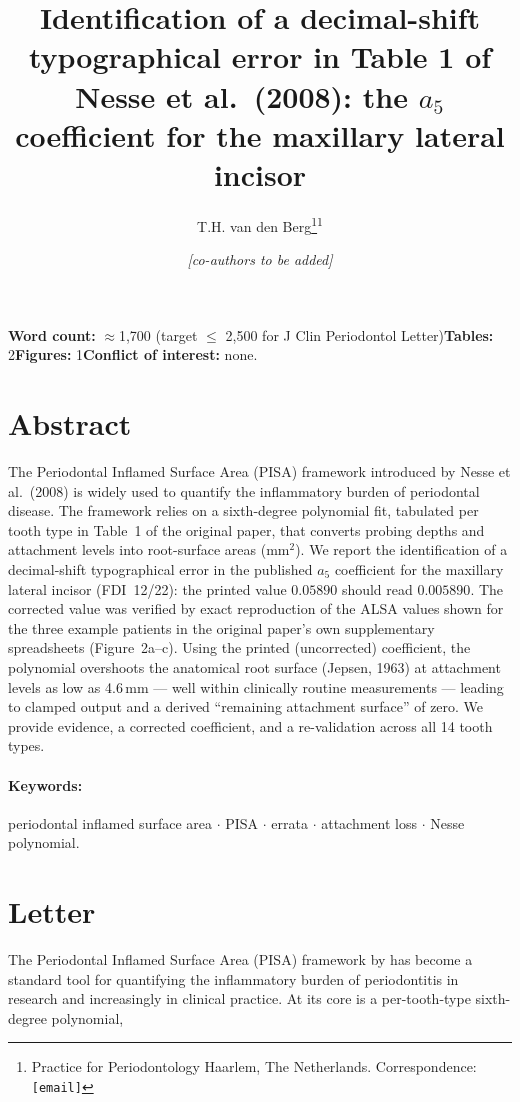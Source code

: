 \documentclass[11pt,a4paper]{article}
\title{\bfseries Identification of a decimal-shift typographical error in
Table 1 of Nesse et al.\ (2008): the $a_5$ coefficient for the maxillary
lateral incisor}
\author{T.H. van den Berg\thanks{Practice for Periodontology Haarlem, The
Netherlands. Correspondence: \texttt{[email]}}\;\textsuperscript{1}
\and \emph{[co-authors to be added]}}
\date{}
\begin{document}
\maketitle

\noindent\textbf{Word count:} $\approx$1{,}700 (target $\le$ 2{,}500
for J Clin Periodontol Letter)\quad\textbf{Tables:} 2\quad\textbf{Figures:} 1\quad\textbf{Conflict of interest:} none.

\section*{Abstract}
The Periodontal Inflamed Surface Area (PISA) framework introduced by
Nesse et al.\ (2008) is widely used to quantify the inflammatory burden
of periodontal disease. The framework relies on a sixth-degree polynomial
fit, tabulated per tooth type in Table~1 of the original paper, that
converts probing depths and attachment levels into root-surface areas
(mm$^2$). We report the identification of a decimal-shift typographical
error in the published $a_5$ coefficient for the maxillary lateral
incisor (FDI~12/22): the printed value $0.05890$ should read
$\mathbf{0.005890}$. The corrected value was verified by exact
reproduction of the ALSA values shown for the three example patients in
the original paper's own supplementary spreadsheets (Figure~2a--c). Using
the printed (uncorrected) coefficient, the polynomial overshoots the
anatomical root surface (Jepsen, 1963) at attachment levels as low as
4.6\,mm --- well within clinically routine measurements --- leading to
clamped output and a derived ``remaining attachment surface'' of zero.
We provide evidence, a corrected coefficient, and a re-validation across
all 14 tooth types.

\paragraph{Keywords:} periodontal inflamed surface area $\cdot$ PISA
$\cdot$ errata $\cdot$ attachment loss $\cdot$ Nesse polynomial.

\section*{Letter}

The Periodontal Inflamed Surface Area (PISA) framework by
\citet{Nesse2008} has become a standard tool for quantifying the
inflammatory burden of periodontitis in research and increasingly in
clinical practice. At its core is a per-tooth-type sixth-degree polynomial,
\end{document}
